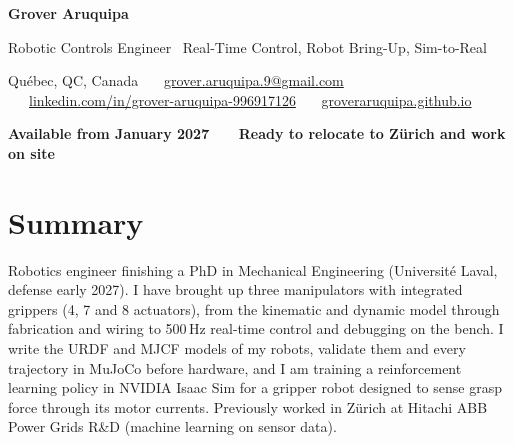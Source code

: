 \documentclass[10pt,a4paper]{article}
\begin{document}
{\LARGE\bfseries Grover Aruquipa}\par\vspace{2pt}
{\large Robotic Controls Engineer \textbar\ Real-Time Control, Robot Bring-Up, Sim-to-Real}\par\vspace{3pt}
{\small Qu\'ebec, QC, Canada \ \textbullet\ \
\href{mailto:grover.aruquipa.9@gmail.com}{grover.aruquipa.9@gmail.com} \ \textbullet\ \
\href{https://www.linkedin.com/in/grover-aruquipa-996917126}{linkedin.com/in/grover-aruquipa-996917126} \ \textbullet\ \
\href{https://groveraruquipa.github.io}{groveraruquipa.github.io}}\par\vspace{1pt}
{\small\bfseries Available from January 2027 \ \textbullet\ \ Ready to relocate to Z\"urich and work on site}\par

\section{Summary}
Robotics engineer finishing a PhD in Mechanical Engineering (Universit\'e Laval, defense early 2027). I have brought up
three manipulators with integrated grippers (4, 7 and 8 actuators), from the kinematic and dynamic model through
fabrication and wiring to 500\,Hz real-time control and debugging on the bench. I write the URDF and MJCF models of my robots,
validate them and every trajectory in MuJoCo before hardware, and I am training a reinforcement learning policy in NVIDIA
Isaac Sim for a gripper robot designed to sense grasp force through its motor currents. Previously worked in Z\"urich at
Hitachi ABB Power Grids R\&D (machine learning on sensor data).

\end{document}
